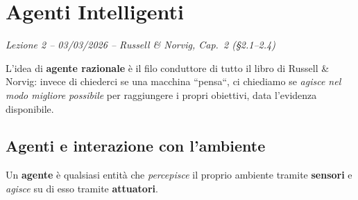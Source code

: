 \chapter{Agenti Intelligenti}
\begin{flushright}\small\textit{Lezione 2 -- 03/03/2026 -- Russell \& Norvig, Cap.\ 2 (\S2.1--2.4)}\end{flushright}

L'idea di \textbf{agente razionale} è il filo conduttore di tutto il libro di Russell \& Norvig: invece di chiederci se una macchina ``pensa``, ci chiediamo se \emph{agisce nel modo migliore possibile} per raggiungere i propri obiettivi, data l'evidenza disponibile.


\section{Agenti e interazione con l'ambiente}
\begin{defbox}[Agente]
Un \textbf{agente} è qualsiasi entità che \emph{percepisce} il proprio ambiente tramite \textbf{sensori} e \emph{agisce} su di esso tramite \textbf{attuatori}.
\end{defbox}

